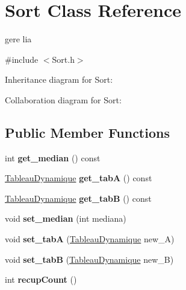 \hypertarget{classSort}{}\section{Sort Class Reference}
\label{classSort}


gere l\textquotesingle{}ia  




{\ttfamily \#include $<$Sort.\+h$>$}



Inheritance diagram for Sort\+:


Collaboration diagram for Sort\+:
\subsection*{Public Member Functions}
\begin{DoxyCompactItemize}
\item 
int {\bfseries get\+\_\+median} () const \hypertarget{classSort_a14eeb71be7a9ba2b1993dbe580fdd505}{}\label{classSort_a14eeb71be7a9ba2b1993dbe580fdd505}

\item 
\hyperlink{classTableauDynamique}{Tableau\+Dynamique} {\bfseries get\+\_\+tabA} () const \hypertarget{classSort_a494cdca5cf138810db59d182a30b8053}{}\label{classSort_a494cdca5cf138810db59d182a30b8053}

\item 
\hyperlink{classTableauDynamique}{Tableau\+Dynamique} {\bfseries get\+\_\+tabB} () const \hypertarget{classSort_a32f2a627a0a301ae0c994928beb89bdb}{}\label{classSort_a32f2a627a0a301ae0c994928beb89bdb}

\item 
void {\bfseries set\+\_\+median} (int mediana)\hypertarget{classSort_a456a699f578b1f4923c448cbef3d557f}{}\label{classSort_a456a699f578b1f4923c448cbef3d557f}

\item 
void {\bfseries set\+\_\+tabA} (\hyperlink{classTableauDynamique}{Tableau\+Dynamique} new\+\_\+A)\hypertarget{classSort_a12c55d8ac2d3490f9d7afa5ffc382470}{}\label{classSort_a12c55d8ac2d3490f9d7afa5ffc382470}

\item 
void {\bfseries set\+\_\+tabB} (\hyperlink{classTableauDynamique}{Tableau\+Dynamique} new\+\_\+B)\hypertarget{classSort_a99c822a1cffb23cc8d167d0ee143a699}{}\label{classSort_a99c822a1cffb23cc8d167d0ee143a699}

\item 
int {\bfseries recup\+Count} ()\hypertarget{classSort_a1ccbb1849c8b9d8ef83cc8f7da4416e5}{}\label{classSort_a1ccbb1849c8b9d8ef83cc8f7da4416e5}


\end{DoxyCompactItemize}
